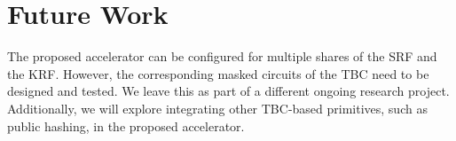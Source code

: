 \documentclass[conference]{IEEEtran}
\begin{document}
\section{Future Work}

The proposed accelerator can be configured for multiple shares of the SRF and the KRF. However, the corresponding masked circuits of the TBC need to be designed and tested. We leave this as part of a different ongoing research project. Additionally, we will explore integrating other TBC-based primitives, such as public hashing, in the proposed accelerator.





\end{document}

